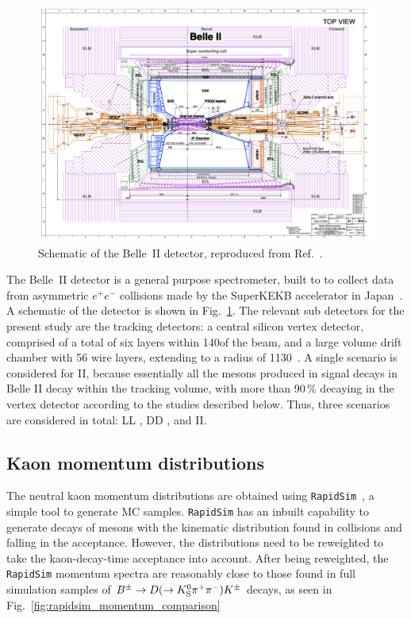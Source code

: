 \begin{figure}[tb]
  \centering
  \includegraphics[width=0.8\columnwidth]{figures/ks_chapter/belledetector.png}
  \caption{Schematic of the Belle~II detector, reproduced from Ref.~\cite{kouBelleIIPhysics2019a}.}
  \label{fig:belleII_detector}
\end{figure}

The Belle~II detector is a general purpose spectrometer, built to to collect data from asymmetric $e^+e^-$ collisions made by the SuperKEKB accelerator in Japan~\cite{}. A schematic of the detector is shown in Fig.~\ref{fig:belleII_detector}. The relevant sub detectors for the present study are the tracking detectors: a central silicon vertex detector, comprised of a total of six layers within 140\mm of the beam, and a large volume drift chamber with 56 wire layers, extending to a radius of 1130\mm~\cite{kouBelleIIPhysics2019a}. 
A single scenario is considered for \belle II, because essentially all the \KS mesons produced in signal decays in Belle II decay within the tracking volume, with more than 90\,\% decaying in the vertex detector according to the studies described below. Thus, three scenarios are considered in total: LL \lhcb, DD \lhcb, and \belle II.


\subsection{Kaon momentum distributions} %
\label{sub:kaon_momentum_distributions}

The neutral kaon momentum distributions are obtained using \texttt{RapidSim}~\cite{cowanRapidSimApplicationFast2017}, a simple tool to generate MC samples. \texttt{RapidSim} has an inbuilt capability to generate decays of \B mesons with the kinematic distribution found in \lhcb collisions and falling in the \lhcb acceptance. However, the distributions need to be reweighted to take the kaon-decay-time acceptance into account. After being reweighted, the \texttt{RapidSim} momentum spectra are reasonably close to those found in full \lhcb simulation samples of ${{B}^\pm}\rightarrow{\ensuremath{D}}(\rightarrow{\ensuremath{{K}^0_{\mathrm{S}}}}{\ensuremath{{\pi}^+}}{\ensuremath{{\pi}^-}}){{K}^\pm}$ decays, as seen in Fig.~\ref{fig:rapidsim_momentum_comparison}


